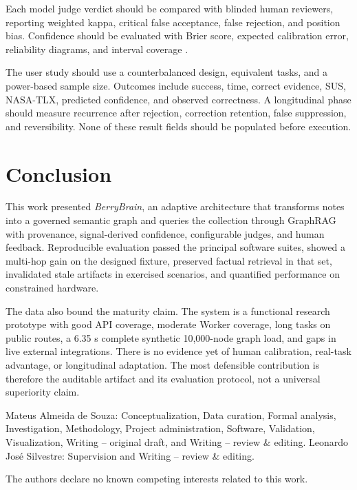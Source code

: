 \documentclass{sbc2023}
\newcommand{\BerryBrain}{\textit{BerryBrain}}
\begin{document}
Each model judge verdict should be compared with blinded human reviewers, reporting weighted
kappa, critical false acceptance, false rejection, and position bias. Confidence should be
evaluated with Brier score, expected calibration error, reliability diagrams, and interval
coverage \cite{brier1950,guo2017calibration}.

The user study should use a counterbalanced design, equivalent tasks, and a power-based sample
size. Outcomes include success, time, correct evidence, SUS, NASA-TLX, predicted confidence, and
observed correctness. A longitudinal phase should measure recurrence after rejection, correction
retention, false suppression, and reversibility. None of these result fields should be populated
before execution.

\section{Conclusion}
\label{sec:conclusion}

This work presented \BerryBrain, an adaptive architecture that transforms notes into a governed
semantic graph and queries the collection through GraphRAG with provenance, signal-derived
confidence, configurable judges, and human feedback. Reproducible evaluation passed the principal
software suites, showed a multi-hop gain on the designed fixture, preserved factual retrieval in
that set, invalidated stale artifacts in exercised scenarios, and quantified performance on
constrained hardware.

The data also bound the maturity claim. The system is a functional research prototype with good
API coverage, moderate Worker coverage, long tasks on public routes, a 6.35 s complete synthetic
10,000-node graph load, and gaps in live external integrations. There is no evidence yet of human
calibration, real-task advantage, or longitudinal adaptation. The most defensible contribution is
therefore the auditable artifact and its evaluation protocol, not a universal superiority claim.

\begin{contributions}
Mateus Almeida de Souza: Conceptualization, Data curation, Formal analysis, Investigation,
Methodology, Project administration, Software, Validation, Visualization, Writing -- original
draft, and Writing -- review \& editing. Leonardo José Silvestre: Supervision and Writing -- review
\& editing.
\end{contributions}

\begin{interests}
The authors declare no known competing interests related to this work.
\end{interests}
\end{document}
